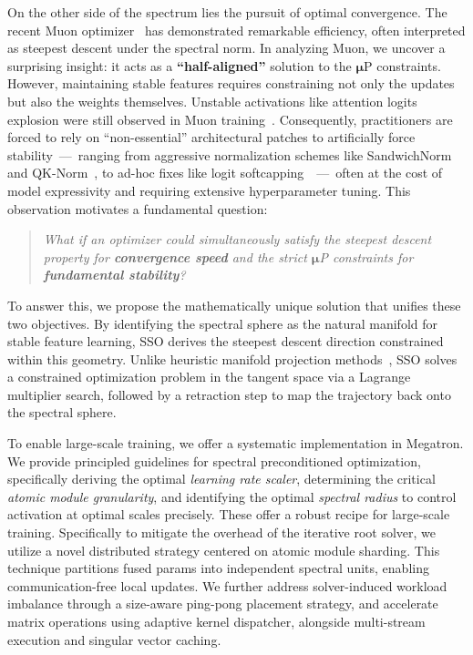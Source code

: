 On the other side of the spectrum lies the pursuit of optimal convergence. The recent Muon optimizer~\citep{jordan2024muon} has demonstrated remarkable efficiency, often interpreted as steepest descent under the spectral norm. In analyzing Muon, we uncover a surprising insight: it acts as a \textbf{``half-aligned''}  solution to the $\boldsymbol{\mu}$P constraints. However, maintaining stable features requires constraining not only the updates but also the weights themselves. Unstable activations like attention logits explosion were still observed in Muon training~\citep{kimiteam2025kimik2openagentic}. Consequently, practitioners are forced to rely on ``non-essential'' architectural patches to artificially force stability~---~ranging from aggressive normalization schemes like SandwichNorm~\citep{ding2021cogviewmasteringtexttoimagegeneration} and QK-Norm~\citep{henry2020querykeynormalizationtransformers}, to ad-hoc fixes like logit softcapping~\citep{kimiteam2025kimik2openagentic}~---~often at the cost of model expressivity and requiring extensive hyperparameter tuning. This observation motivates a fundamental question:
\begin{quote}
\emph{What if an optimizer could simultaneously satisfy the steepest descent property for \textbf{convergence speed} and the strict $\boldsymbol{\mu}$P constraints for \textbf{fundamental stability}?}
\end{quote}
To answer this, we propose the mathematically unique solution that unifies these two objectives. By identifying the spectral sphere as the natural manifold for stable feature learning, SSO derives the steepest descent direction constrained within this geometry. Unlike heuristic manifold projection methods~\citep{xie2025mhcmanifoldconstrainedhyperconnections,pethick2025trainingdeeplearningmodels}, SSO solves a constrained optimization problem in the tangent space via a Lagrange multiplier search, followed by a retraction step to map the trajectory back onto the spectral sphere.

To enable large-scale training, we offer a systematic implementation in Megatron. We provide principled guidelines for spectral preconditioned optimization, specifically deriving the optimal \emph{learning rate scaler}, determining the critical \emph{atomic module granularity}, and identifying the optimal \emph{spectral radius} to control activation at optimal scales precisely. These offer a robust recipe for large-scale training. Specifically to mitigate the overhead of the iterative root solver, we utilize a novel distributed strategy centered on atomic module sharding\citep{emergeing_optimizer}. This technique partitions fused params into independent spectral units, enabling communication-free local updates. We further address solver-induced workload imbalance through a size-aware ping-pong placement strategy, and accelerate matrix operations using adaptive kernel dispatcher, alongside multi-stream execution and singular vector caching.

